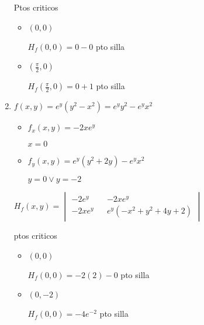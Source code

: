 \documentclass[../practica_06.tex]{subfiles}
\begin{document}
\begin{enumerate}
            Ptos criticos \begin{itemize}
                \item $(0,0)$
                
                    $H_f(0,0) = 0 - 0$ pto silla

                \item $(\frac{\pi}{2},0)$
                
                    $H_f(\frac{\pi}{2},0) = 0 + 1$ pto silla

            \end{itemize}

        \item $f(x,y) = e^y(y^2-x^2) = e^yy^2 - e^yx^2$
        
            \begin{itemize}
                \item $f_x(x,y) = -2xe^y$
                
                    $x = 0$

                \item $f_y(x,y) = e^y(y^2 + 2y) - e^yx^2$
                
                    $ y = 0 \vee y = -2 $

            \end{itemize}

            $H_f(x,y) = \begin{vmatrix}
                -2e^y && -2xe^y\\
                -2xe^y &&  e^y(-x^2 + y^2 + 4y + 2)
            \end{vmatrix}$

            ptos criticos \begin{itemize}
                \item $(0,0)$
                
                    $H_f(0,0) = -2(2) - 0 $ pto silla 
                
                \item $(0,-2)$
                
                    $H_f(0,0) = -4e^{-2} $ pto silla

            \end{itemize}

    \end{enumerate}
\end{document}
